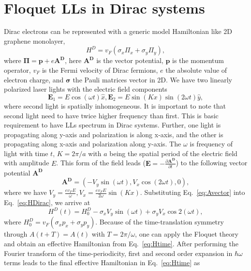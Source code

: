 \documentclass[aps,prl,showpacs,twocolumn,amsmath,amssymb,superscriptaddress]{revtex4-2}
\renewcommand{\vec}[1]{\mathbf{#1}}
\begin{document}
\section{Floquet LLs in Dirac systems}
Dirac electrons can be represented with a generic model Hamiltonian like 2D graphene monolayer,
\begin{equation}\label{eq:HDirac}
	H^D=v_F(\sigma _{x}\Pi _{x}+\sigma _{y}\Pi _{y}),
\end{equation}%
where $\vec{\Pi =p+}e\vec{A^D}$, here $\vec{A^D}$ is the vector
potential, $\vec{p}$ is the momentum operator, $v_F$ is the Fermi
velocity of Dirac fermions, $e$ the absolute value of electron charge,
and $\vec{\sigma}$ the Pauli matrices vector in 2D. We have two linearly polarized laser lights with the electric field components
\begin{equation} \label{eq:Efield}
\vec{E}_{1} =E\cos (\omega t)\hat{x},\vec{E}_{2}=E\sin
(Kx)\sin (2\omega t)\hat{y},
\end{equation}%
where second light is spatially inhomogeneous. It is important to note that second light need to have twice higher frequency than first. This is basic requirement to have LLs spectrum in Dirac systems. Further, one light is propagating along y-axis and polarization is along x-axis, and the other is propagating along x-axis and polarization along y-axis. The $\omega $ is frequency of light with time $t$, $%
K=2\pi /a$ with $a$ being the spatial period of the electric field with
amplitude $E$. This form of the field leads ($\vec{E}=-\frac{\partial \vec{A^D}}{\partial t}$) to the following vector potential $\vec{A^D}$
\begin{equation}\label{eq:Avector}
\vec{A^D}=(-V_y\sin (\omega t), V_x \cos (2\omega t),0),
\end{equation}%
where we have $V_{y}=\frac{ev_FE}{\omega },V_{x}=\frac{ev_FE}{2\omega }\sin(Kx)$. Substituting Eq.~\eqref{eq:Avector} into Eq.~\eqref{eq:HDirac}, we arrive at%
\begin{equation}\label{eq:Htime}
H^D(t)=H_{0}^D- \sigma _{x}V_{y}\sin (\omega t)+\sigma _{y}V_{x}\cos 2(\omega
t),
\end{equation}%
where $H_{0}^D=v_F(\sigma _{x} p_{x}+\sigma_{y} p_{y})$. Because of the time-translation symmetry through $A(t+T)=A(t)$ with $T=2\pi /\omega $, one can apply the Floquet theory \cite{AEE, MBL, supp} and obtain an effective Hamiltonian from Eq.~\eqref{eq:Htime}. After performing the Fourier transform of the time-periodicity, first and second order expansion in $\hbar\omega$ terms leads to the final effective Hamiltonian in Eq.~\eqref{eq:Htime} as
\end{document}

